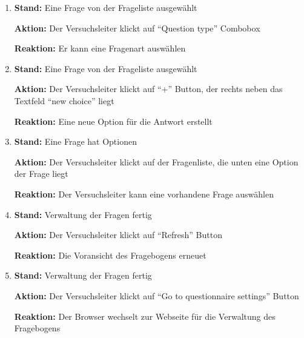 \documentclass[a4paper]{scrreprt}
\begin{document}
\begin{itemize}
\begin{enumerate}
                        \item \par \textbf{Stand: } Eine Frage von der Frageliste ausgewählt
                              \par \textbf{Aktion: } Der \gls{Versuchsleiter} klickt auf ``Question type'' Combobox
                              \par \textbf{Reaktion: } Er kann eine Fragenart auswählen

                        \item \par \textbf{Stand: }  Eine Frage von der Frageliste ausgewählt
                              \par \textbf{Aktion: } Der \gls{Versuchsleiter} klickt auf ``+'' Button, der rechts neben das Textfeld ``new choice'' liegt
                              \par \textbf{Reaktion: } Eine neue Option für die Antwort erstellt

                        \item \par \textbf{Stand: } Eine Frage hat Optionen
                              \par \textbf{Aktion: } Der \gls{Versuchsleiter} klickt auf der Fragenliste, die unten eine Option der Frage liegt
                              \par \textbf{Reaktion: }Der \gls{Versuchsleiter} kann eine vorhandene Frage auswählen

                        \item \par \textbf{Stand: }  Verwaltung der Fragen fertig
                              \par \textbf{Aktion: } Der \gls{Versuchsleiter} klickt auf ``Refresh'' Button
                              \par \textbf{Reaktion: } Die Voransicht des Fragebogens erneuet

                        \item \par \textbf{Stand: } Verwaltung der Fragen fertig
                              \par \textbf{Aktion: } Der \gls{Versuchsleiter} klickt auf ``Go to questionnaire settings'' Button
                              \par \textbf{Reaktion: } Der Browser wechselt zur Webseite für die Verwaltung des Fragebogens        


\end{enumerate}
\end{itemize}
\end{document}
